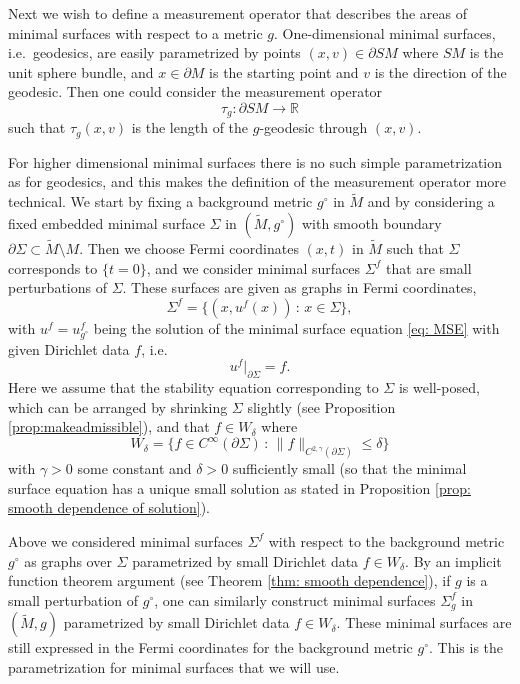 \documentclass[11pt]{amsart}
\theoremstyle{definition}
\numberwithin{equation}{section}
\newcommand{\norm}[1]{\lVert #1 \rVert}         %
\newcommand{\p}{\partial}
\begin{document}
Next we wish to define a measurement operator that describes the areas of minimal surfaces with respect to a metric $g$. One-dimensional minimal surfaces, i.e.\ geodesics, are easily parametrized by points $(x,v) \in \partial SM$ where $SM$ is the unit sphere bundle, and $x \in \p M$ is the starting point and $v$ is the direction of the geodesic. Then one could consider the measurement operator 
\[
\tau_g: \partial SM \to \mathbb{R}
\]
such that $\tau_g(x,v)$ is the length of the $g$-geodesic through $(x,v)$.

For higher dimensional minimal surfaces there is no such simple parametrization as for geodesics, and this makes the definition of the measurement operator more technical. We start by fixing a background metric ${g}^{\circ}$ in $\widetilde{M}$ and by considering a fixed embedded minimal surface $\Sigma$ in $(\widetilde{M}, {g}^{\circ})$ with smooth boundary $\p \Sigma \subset \widetilde{M} \setminus M$. Then we choose Fermi coordinates $(x,t)$ in $\widetilde{M}$ such that $\Sigma$ corresponds to $\{t=0\}$, and we consider minimal surfaces $\Sigma^f$ that are small perturbations of $\Sigma$. These surfaces are given as graphs in Fermi coordinates, 
\[
\Sigma^f = \{ (x, u^f(x)) \,:\, x \in \Sigma \},
\]
with $u^f = u_{{g}^{\circ}}^f$ being the solution of the minimal surface equation \eqref{eq: MSE} with given Dirichlet data $f$, i.e. 
\[
u^f|_{\p \Sigma} = f.
\]
Here we assume that the stability equation corresponding to $\Sigma$ is well-posed, which can be arranged by shrinking $\Sigma$ slightly (see Proposition \ref{prop:makeadmissible}), and that $f \in W_{\delta}$ where 
\[
W_{\delta} = \{ f \in C^{\infty}(\p \Sigma) \,:\, \norm{f}_{C^{2,\gamma}(\p \Sigma)} \leq \delta \}
\]
with $\gamma>0$ some constant and $\delta > 0$ sufficiently small (so that the minimal surface equation has a unique small solution as stated in Proposition \ref{prop: smooth dependence of solution}).

Above we considered minimal surfaces $\Sigma^f$ with respect to the background metric ${g}^{\circ}$ as graphs over $\Sigma$ parametrized by small Dirichlet data $f \in W_{\delta}$. By an implicit function theorem argument (see Theorem \ref{thm: smooth dependence}), if ${g}$ is a small perturbation of ${g}^{\circ}$, one can similarly construct minimal surfaces $\Sigma_{{g}}^f$ in $(\widetilde{M}, {g})$ parametrized by small Dirichlet data $f \in W_{\delta}$. These minimal surfaces are still expressed in the Fermi coordinates for the background metric $ g^\circ$. This is the parametrization for minimal surfaces that we will use.
\end{document}
